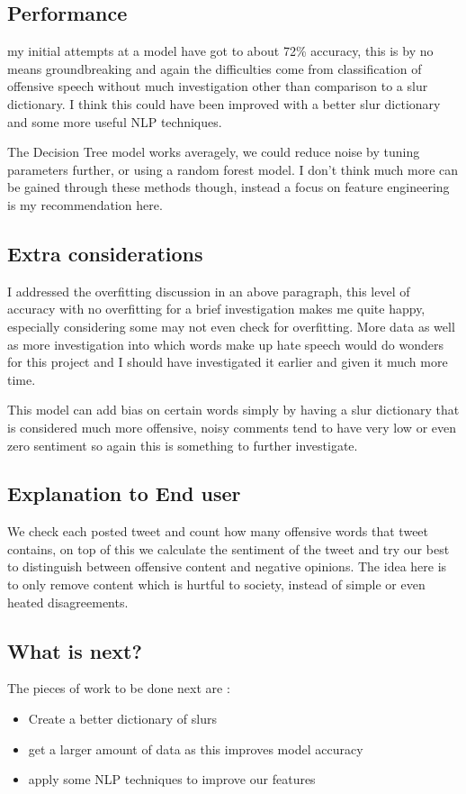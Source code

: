\documentclass[a4paper]{article}
\begin{document}
\subsection{Performance}
my initial attempts at a model have got to about 72\% accuracy, this is by no means groundbreaking and again the difficulties come from classification of offensive speech without much investigation other than comparison to a slur dictionary. I think this could have been improved with a better slur dictionary and some more useful NLP techniques.

The Decision Tree model works averagely, we could reduce noise by tuning parameters further, or using a random forest model. I don't think much more can be gained through these methods though, instead a focus on feature engineering is my recommendation here.

\subsection{Extra considerations}
I addressed the overfitting discussion in an above paragraph, this level of accuracy with no overfitting for a brief investigation makes me quite happy, especially considering some may not even check for overfitting. More data as well as more investigation into which words make up hate speech would do wonders for this project and I should have investigated it earlier and given it much more time.

This model can add bias on certain words simply by having a slur dictionary that is considered much more offensive, noisy comments tend to have very low or even zero sentiment so again this is something to further investigate.

\subsection{Explanation to End user}
We check each posted tweet and count how many offensive words that tweet contains, on top of this we calculate the sentiment of the tweet and try our best to distinguish between offensive content and negative opinions. The idea here is to only remove content which is hurtful to society, instead of simple or even heated disagreements.

\subsection{What is next?}
The pieces of work to be done next are :
\begin{itemize}
\item Create a better dictionary of slurs
\item get a larger amount of data as this improves model accuracy
\item apply some NLP techniques to improve our features
\end{itemize}
\end{document}

